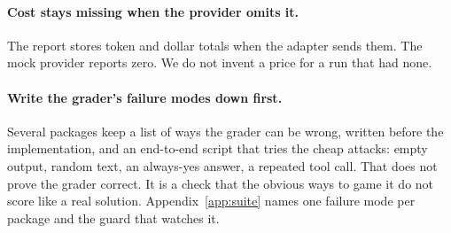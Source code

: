 \paragraph{Cost stays missing when the provider omits it.}
The report stores token and dollar totals when the adapter sends them. The mock provider reports zero. We do not invent a price for a run that had none.

\paragraph{Write the grader's failure modes down first.}
Several packages keep a list of ways the grader can be wrong, written before the implementation, and an end-to-end script that tries the cheap attacks: empty output, random text, an always-yes answer, a repeated tool call. That does not prove the grader correct. It is a check that the obvious ways to game it do not score like a real solution. Appendix~\ref{app:suite} names one failure mode per package and the guard that watches it.
